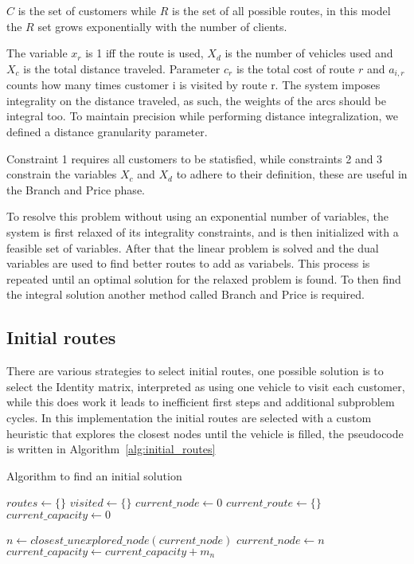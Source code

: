 $C$ is the set of customers while $R$ is the set of all possible routes, in this model the $R$ set grows exponentially with the number of clients.

The variable $x_r$ is 1 iff the route is used, $X_d$ is the number of vehicles used and $X_c$ is the total distance traveled. Parameter $c_r$ is the total cost of route $r$ and $a_{i, r}$ counts how many times customer i is visited by route r. The system imposes integrality on the distance traveled, as such, the weights of the arcs should be integral too. To maintain precision while performing distance integralization, we defined a distance granularity parameter.

Constraint 1 requires all customers to be statisfied, while constraints 2 and 3 constrain the variables $X_c$ and $X_d$ to adhere to their definition, these are useful in the Branch and Price phase.

To resolve this problem without using an exponential number of variables, the system is first relaxed of its integrality constraints, and is then initialized with a feasible set of variables. After that the linear problem is solved and the dual variables are used to find better routes to add as variabels. This process is repeated until an optimal solution for the relaxed problem is found. To then find the integral solution another method called Branch and Price is required.

\subsection{Initial routes}
There are various strategies to select initial routes, one possible solution is to select the Identity matrix, interpreted as using one vehicle to visit each customer, while this does work it leads to inefficient first steps and additional subproblem cycles.
In this implementation the initial routes are selected with a custom heuristic that explores the closest nodes until the vehicle is filled, the pseudocode is written in Algorithm~\ref{alg:initial_routes}
\begin{algorithm}[htb]
  \caption{Algorithm to find an initial solution}\label{alg:initial_routes}
  \begin{algorithmic}
    \State $routes \gets \{\}$
    \State $visited \gets \{\}$
    \State $current\_node \gets 0$
    \State $current\_route \gets \{\}$
    \State $current\_capacity \gets 0$

      \State $n \gets closest\_unexplored\_node(current\_node)$
      \EndIf
      \State $current\_node \gets n$
      \State $current\_capacity \gets current\_capacity + m_n $
    \EndWhile

  \end{algorithmic}
\end{algorithm}


